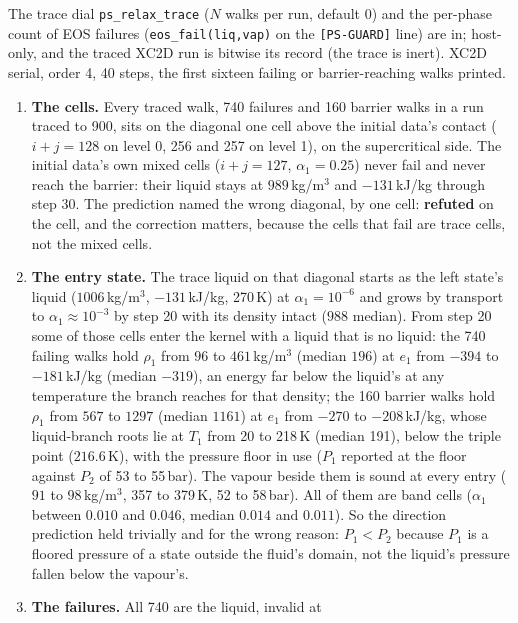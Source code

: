 \documentclass[11pt,a4paper]{article}
\newcommand{\code}[1]{\texttt{\small #1}}
\begin{document}
The trace dial \code{ps\_relax\_trace} ($N$ walks per run, default 0)
and the per-phase count of EOS failures (\code{eos\_fail(liq,vap)} on
the \code{[PS-GUARD]} line) are in; host-only, and the traced XC2D run
is bitwise its record (the trace is inert).  XC2D serial, order 4, 40
steps, the first sixteen failing or barrier-reaching walks printed.
\begin{enumerate}[nosep]
\item \textbf{The cells.}  Every traced walk, 740 failures and 160
      barrier walks in a run traced to 900, sits on the diagonal one
      cell above the initial data's contact ($i + j = 128$ on level 0,
      256 and 257 on level 1), on the supercritical side.  The initial
      data's own mixed cells ($i + j = 127$, $\alpha_1 = 0.25$) never
      fail and never reach the barrier: their liquid stays at
      $989$\,kg/m$^3$ and $-131$\,kJ/kg through step 30.  The
      prediction named the wrong diagonal, by one cell: \textbf{refuted}
      on the cell, and the correction matters, because the cells that
      fail are trace cells, not the mixed cells.
\item \textbf{The entry state.}  The trace liquid on that diagonal
      starts as the left state's liquid ($1006$\,kg/m$^3$,
      $-131$\,kJ/kg, 270\,K) at $\alpha_1 = 10^{-6}$ and grows by
      transport to $\alpha_1 \approx 10^{-3}$ by step 20 with its density
      intact ($988$ median).  From step 20 some of those cells enter the
      kernel with a liquid that is no liquid: the 740 failing walks hold
      $\rho_1$ from $96$ to $461$\,kg/m$^3$ (median $196$) at
      $e_1$ from $-394$ to $-181$\,kJ/kg (median $-319$), an energy far
      below the liquid's at any temperature the branch reaches for that
      density; the 160 barrier walks hold $\rho_1$ from $567$ to
      $1297$ (median $1161$) at $e_1$ from $-270$ to $-208$\,kJ/kg,
      whose liquid-branch roots lie at $T_1$ from 20 to 218\,K (median
      191), below the triple point ($216.6$\,K), with the pressure floor
      in use ($P_1$ reported at the floor against $P_2$ of 53 to
      55\,bar).  The vapour beside them is sound at every entry
      ($91$ to $98$\,kg/m$^3$, 357 to 379\,K, 52 to 58\,bar).  All of
      them are band cells ($\alpha_1$ between $0.010$ and $0.046$,
      median $0.014$ and $0.011$).  So the direction prediction held
      trivially and for the wrong reason: $P_1 < P_2$ because $P_1$ is a
      floored pressure of a state outside the fluid's domain, not the
      liquid's pressure fallen below the vapour's.
\item \textbf{The failures.}  All 740 are the liquid, invalid at

\end{enumerate}
\end{document}
